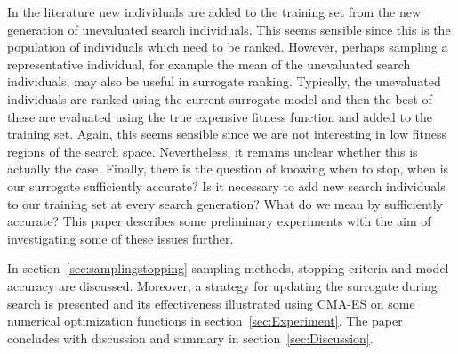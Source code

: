 \documentclass[10pt, conference]{IEEEtran} %
\begin{document}
In the literature new individuals are added to the training set from the new generation of unevaluated search individuals. This seems sensible since this is the population of individuals which need to be ranked. However, perhaps sampling a representative individual, for example the mean of the unevaluated search individuals, may also be useful in surrogate ranking. Typically, the unevaluated individuals  are ranked using the current surrogate model and then the best of these are evaluated using the true expensive fitness function and added to the training set. Again, this seems sensible since we are not interesting in low fitness regions of the search space. Nevertheless, it remains unclear whether this is actually the case. Finally, there is the question of knowing when to stop, when is our surrogate sufficiently accurate? Is it necessary to add new search individuals  to our training set at every search generation? What do we mean by sufficiently accurate? This paper describes some preliminary experiments with the aim of investigating some of these issues further.

In section~\ref{sec:samplingstopping} sampling methods, stopping criteria and model accuracy are discussed. Moreover, a strategy for updating the surrogate during search is presented and its effectiveness illustrated using CMA-ES on some numerical optimization functions in section~\ref{sec:Experiment}. The paper concludes with discussion and summary in section~\ref{sec:Discussion}.
\end{document}
